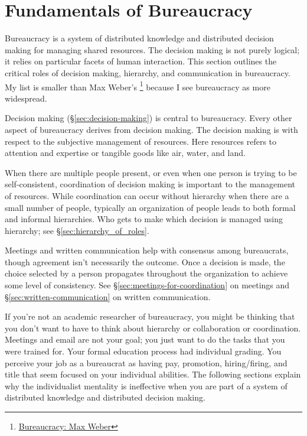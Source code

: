 \section{Fundamentals of Bureaucracy\label{fundamentals_of_b}}
  
Bureaucracy is a system of distributed knowledge and distributed decision making for managing shared resources. The decision making is not purely logical; it relies on particular facets of human interaction. This section outlines the critical roles of decision making, hierarchy, and communication in bureaucracy. 
My list is smaller than Max Weber's \cite{2015_Weber}\footnote{\href{https://en.wikipedia.org/wiki/Bureaucracy\#Max_Weber}{Bureaucracy: Max Weber}} because I see bureaucracy as more widespread.

Decision making (\S\ref{sec:decision-making}) is central to bureaucracy. Every other aspect of bureaucracy derives from decision making. The decision making is with respect to the subjective management of resources. Here resources refers to attention and expertise or tangible goods like air, water, and land. 

When there are multiple people present, or even when one person is trying to be self-consistent, coordination of decision making is important to the management of resources. While coordination can occur without hierarchy when there are a small number of people, typically an organization of people leads to both formal and informal hierarchies. Who gets to make which decision is managed using hierarchy; see \S\ref{sec:hierarchy_of_roles}.

Meetings and written communication help with consensus among bureaucrats, though agreement isn't necessarily the outcome.
Once a decision is made, the choice selected by a person propagates throughout the organization to achieve some level of consistency. See \S\ref{sec:meetings-for-coordination} on meetings and \S\ref{sec:written-communication} on written communication.

If you're not an academic researcher of bureaucracy, you might be thinking that you don't want to have to think about hierarchy or collaboration or coordination. Meetings and email are not your goal; you just want to do the tasks that you were trained for. Your formal education process had individual grading. You perceive your job as a bureaucrat as having pay, promotion, hiring/firing, and title that  seem focused on your individual abilities. The following sections explain why the individualist mentality is ineffective when you are part of a  system of distributed knowledge and distributed decision making. 


